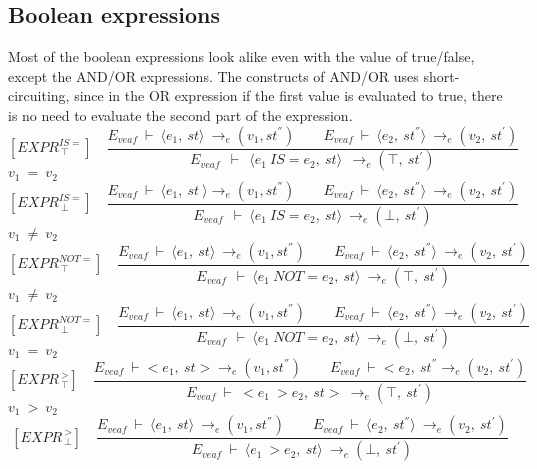 \subsection{Boolean expressions}
Most of the boolean expressions look alike even with the value of true/false, except the AND/OR expressions. The constructs of AND/OR uses short-circuiting, since in the OR expression if the first value is evaluated to true, there is no need to evaluate the second part of the expression.
\[
[EXPR^{IS=}_{\ \top}] \quad	
\dfrac{E_{veaf} \ \vdash \ \langle e_1, \ st \rangle \ \rightarrow_e (v_1, st^{''}) \qquad E_{veaf} \ \vdash \ \langle e_2, \ st^{''} \rangle \ \rightarrow_e (v_2, \ st^{'})}{E_{veaf} \ \ \vdash \ \ \langle e_1 \ IS= e_2, \ st \rangle \ \ \rightarrow_e (\top, \ st^{'})}	
\]
\begin{math}		
v_1 \ = \ v_2 		
\end{math}	
\[
[EXPR^{IS=}_{\ \bot}] \quad	
\dfrac{E_{veaf} \ \vdash \ \langle e_1, \ st \ \rangle \rightarrow_e (v_1, st^{''}) \qquad E_{veaf} \ \vdash \ \langle e_2, \ st^{''} \rangle \ \rightarrow_e (v_2, \ st^{'})}{E_{veaf} \ \ \vdash \ \langle e_1 \ IS= e_2, \ st \rangle \ \rightarrow_e (\bot, \ st^{'})}	
\]
\begin{math}		
v_1 \ \not= \ v_2		
\end{math}
\[	
[EXPR^{NOT=}_{\ \top}] \quad	
\dfrac{E_{veaf} \ \vdash \ \langle e_1, \ st \rangle \ \rightarrow_e (v_1, st^{''}) \qquad E_{veaf} \ \vdash \ \langle e_2, \ st^{''} \rangle \ \rightarrow_e (v_2, \ st^{'})}{E_{veaf} \ \ \vdash \ \langle e_1 \ NOT= e_2, \ st \rangle \ \rightarrow_e (\top, \ st^{'})}	
\]	
\begin{math}		
v_1 \ \not= \ v_2		
\end{math} 
\[
[EXPR^{NOT=}_{\ \bot}] \quad	
\dfrac{E_{veaf} \ \vdash \ \langle e_1, \ st \rangle \ \rightarrow_e (v_1, st^{''}) \qquad E_{veaf} \ \vdash \ \langle e_2, \ st^{''} \rangle \ \rightarrow_e (v_2, \ st^{'})}{E_{veaf} \ \ \vdash \ \langle e_1 \ NOT= e_2, \ st \rangle \ \rightarrow_e (\bot, \ st^{'})}	
\]	
\begin{math}		
v_1 \ = \ v_2		
\end{math} 
\[	
[EXPR^{\ >}_{\ \top}] \quad	
\dfrac{E_{veaf} \ \vdash <e_1, \ st> \rightarrow_e (v_1, st^{''}) \qquad E_{veaf} \ \vdash <e_2, \ st^{''} \rightarrow_e (v_2, \ st^{'})}{E_{veaf} \ \vdash \ <e_1 \ > e_2, \ st> \ \rightarrow_e (\top, \ st^{'})}	
\]
\begin{math}		
v_1 \ > \ v_2		
\end{math} 
\[	
[EXPR^{\ >}_{\ \bot}] \quad	
\dfrac{E_{veaf} \ \vdash \ \langle e_1, \ st \rangle \ \rightarrow_e (v_1, st^{''}) \qquad E_{veaf} \ \vdash \ \langle e_2, \ st^{''} \rangle \ \rightarrow_e (v_2, \ st^{'})}{E_{veaf} \ \vdash \ \langle e_1 \ > e_2, \ st \rangle \ \rightarrow_e (\bot, \ st^{'})}
\]
